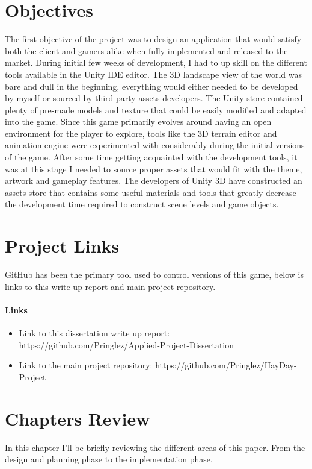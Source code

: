 \section{Objectives}
The first objective of the project was to design an application that would satisfy both the client and gamers alike when fully implemented and released to the market. During initial few weeks of development, I had to up skill on the different tools available in the Unity IDE editor. The 3D landscape view of the world was bare and dull in the beginning, everything would either needed to be developed by myself or sourced by third party assets developers. The Unity store contained plenty of pre-made models and texture that could be easily modified and adapted into the game.
Since this game primarily evolves around having an open environment for the player to explore, tools like the 3D terrain editor and animation engine were experimented with considerably during the initial versions of the game. 
After some time getting acquainted with the development tools, it was at this stage I needed to source proper assets that would fit with the theme, artwork and gameplay features. The developers of Unity 3D have constructed an assets store that contains some useful materials and tools that greatly decrease the development time required to construct scene levels and game objects.

\section{Project Links}
GitHub has been the primary tool used to control versions of this game, below is links to this write up report and main project repository.
\paragraph{Links}
\begin{itemize}
	\item Link to this dissertation write up report: https://github.com/Pringlez/Applied-Project-Dissertation
	\item Link to the main project repository: https://github.com/Pringlez/HayDay-Project
\end{itemize}

\section{Chapters Review}
In this chapter I'll be briefly reviewing the different areas of this paper. From the design and planning phase to the implementation phase.
